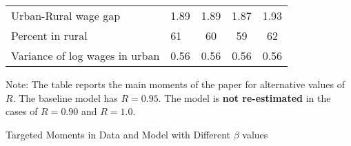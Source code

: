 \documentclass[12pt,pdftex]{article}
\renewcommand{\arraystretch}{1.1}
\begin{document}
\begin{onehalfspacing}
\begin{table}[!htb]
\begin{center}
\begin{tabular}{l l c c c}
\hline
Urban-Rural wage gap                                                & 1.89              & 1.89              & 1.87              & 1.93  \\
Percent in rural                                                    & \phantom{0.}61    & \phantom{0.}60    & \phantom{0.}59    &  \phantom{0.} 62 \\
Variance of log wages in urban                                      & 0.56              & 0.56              &  0.56             &      0.56      \\
\hline
\end{tabular}
\parbox[c]{6.5in}{%
{\footnotesize  \vspace{0.3cm} Note: The table reports the main moments of the paper for alternative values of $R$.
 The baseline model has $R=0.95$. The model is \textbf{not re-estimated} in the cases of $R=0.90$ and $R=1.0$.}
}
\end{center}
\end{table}


\begin{table}[!htb]
\small
\setlength {\tabcolsep}{2mm}
\renewcommand{\arraystretch}{1.2}
\begin{center}
\caption{Targeted Moments in Data and Model with Different $\beta$ values \label{ta:alt_beta}}


\end{center}
\end{table}
\end{onehalfspacing}
\end{document}
